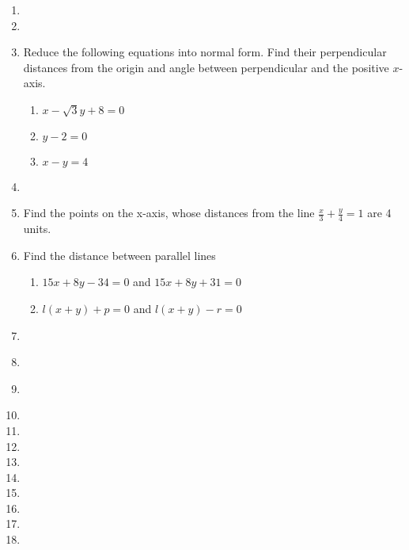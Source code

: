 \begin{enumerate}[label=\thesection.\arabic*,ref=\thesection.\theenumi]

\item 
\item 
\item  Reduce the following equations into normal form. Find their perpendicular distances from the origin and angle between perpendicular and the positive $x$-axis.
\label{chapters/11/10/3/3}
\begin{enumerate}
	\item $x-\sqrt{3}y+8=0$ 
	\item $y-2=0$
	\item $x-y=4$
\end{enumerate}
\solution

\item 
\label{chapters/11/10/3/4}

\item Find the points on the x-axis, whose distances from the line $\frac{x}{3}+\frac{y}{4}=1$ are 4 units.
\label{chapters/11/10/3/5}
	\\
	\solution

\item Find the distance between parallel lines
\label{chapters/11/10/3/6}
\begin{enumerate}
	\item $15x+8y-34=0$ and  $15x+8y+31=0$ \\
	\item  $l(x+y)+p=0$ and  $l(x+y)-r=0$
\end{enumerate}
	\solution

\item 
\label{chapters/11/10/3/7}

\item 
\item 
\label{chapters/11/10/3/9}

\item 
\item 
\item 
\item 
\item 
\item 
\item 
\item 
\item 

\end{enumerate}
